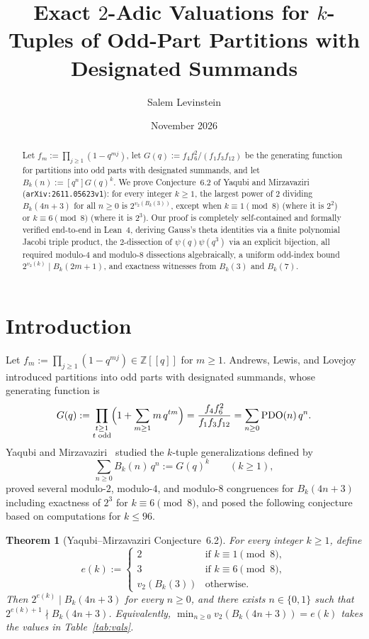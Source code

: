 \documentclass[11pt]{article}
\title{Exact $2$-Adic Valuations for $k$-Tuples of Odd-Part Partitions with Designated Summands}
\author{Salem Levinstein}
\date{November 2026}
\newtheorem{theorem}{Theorem}
\begin{document}
\maketitle

\begin{abstract}
Let $f_m := \prod_{j \ge 1}(1 - q^{mj})$, let $G(q) := f_4 f_6^2 / (f_1 f_3 f_{12})$ be the generating function for partitions into odd parts with designated summands, and let $B_k(n) := [q^n] G(q)^k$. We prove Conjecture~6.2 of Yaqubi and Mirzavaziri (\texttt{arXiv:2611.05623v1}): for every integer $k \ge 1$, the largest power of $2$ dividing $B_k(4n+3)$ for all $n \ge 0$ is $2^{v_2(B_k(3))}$, except when $k \equiv 1 \pmod 8$ (where it is $2^2$) or $k \equiv 6 \pmod 8$ (where it is $2^3$). Our proof is completely self-contained and formally verified end-to-end in Lean~4, deriving Gauss's theta identities via a finite polynomial Jacobi triple product, the $2$-dissection of $\psi(q)\psi(q^3)$ via an explicit bijection, all required modulo-$4$ and modulo-$8$ dissections algebraically, a uniform odd-index bound $2^{v_2(k)} \mid B_k(2m+1)$, and exactness witnesses from $B_k(3)$ and $B_k(7)$.
\end{abstract}

\section{Introduction}

Let $f_m := \prod_{j \ge 1} (1 - q^{mj}) \in \mathbb{Z}[[q]]$ for $m \ge 1$. Andrews, Lewis, and Lovejoy~\cite{ALL} introduced partitions into odd parts with designated summands, whose generating function is
\[
G(q) := \prod_{\substack{t \ge 1 \\ t \text{ odd}}} \Bigl(1 + \sum_{m \ge 1} m\, q^{tm}\Bigr) = \frac{f_4 f_6^2}{f_1 f_3 f_{12}} = \sum_{n \ge 0} \mathrm{PDO}(n)\, q^n.
\]
Yaqubi and Mirzavaziri~\cite{YM} studied the $k$-tuple generalizations defined by
\[
\sum_{n \ge 0} B_k(n)\, q^n := G(q)^k \qquad (k \ge 1),
\]
proved several modulo-$2$, modulo-$4$, and modulo-$8$ congruences for $B_k(4n+3)$ including exactness of $2^3$ for $k \equiv 6 \pmod 8$, and posed the following conjecture based on computations for $k \le 96$.

\begin{theorem}[Yaqubi--Mirzavaziri Conjecture~6.2]\label{thm:main}
For every integer $k \ge 1$, define
\[
e(k) := \begin{cases}
2 & \text{if } k \equiv 1 \pmod 8, \\
3 & \text{if } k \equiv 6 \pmod 8, \\
v_2(B_k(3)) & \text{otherwise.}
\end{cases}
\]
Then $2^{e(k)} \mid B_k(4n+3)$ for every $n \ge 0$, and there exists $n \in \{0, 1\}$ such that $2^{e(k)+1} \nmid B_k(4n+3)$. Equivalently, $\min_{n \ge 0} v_2(B_k(4n+3)) = e(k)$ takes the values in Table~\ref{tab:vals}.
\end{theorem}
\end{document}
